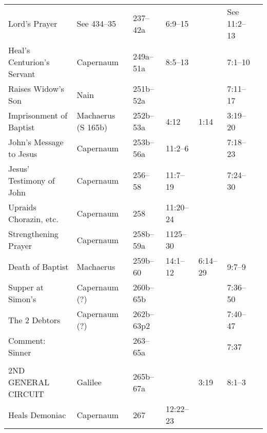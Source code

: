 \begin{longtable}[h]{l@{\hspace{0.5em}}l@{\hspace{0.5em}}l@{\hspace{0.5em}}BBBB}
\quad Lord's Prayer                        & See 434--35         & 237--42a           & 6:9--15           &                    & See 11:2--13          & \\
Heal's Centurion's Servant                 & Capernaum           & 249a--51a          & 8:5--13           &                    & 7:1--10               & \\
Raises Widow's Son                         & Nain                & 251b--52a          &                   &                    & 7:11--17              & \\
Imprisonment of Baptist                    & Machaerus (S 165b)  & 252b--53a          & 4:12              & 1:14               & 3:19--20              & \\
John's Message to Jesus                    & Capernaum           & 253b--56a          & 11:2--6           &                    & 7:18--23              & \\
Jesus' Testimony of John                   & Capernaum           & 256--58            & 11:7--19          &                    & 7:24--30              & \\
Upraids Chorazin, etc.                     & Capernaum           & 258                & 11:20--24         &                    &                       & \\
Strengthening Prayer                       & Capernaum           & 258b--59a          & 1125--30          &                    &                       & \\
Death of Baptist                           & Machaerus           & 259b--60           & 14:1--12          & 6:14--29           & 9:7--9                & \\
Supper at Simon's                          & Capernaum (?)       & 260b--65b          &                   &                    & 7:36--50              & \\
\quad The 2 Debtors                        & Capernaum (?)       & 262b--63p2         &                   &                    & 7:40--47              & \\
\quad Comment: Sinner                      &                     & 263--65a           &                   &                    & 7:37                  & \\
\\
2ND GENERAL CIRCUIT                        & Galilee             & 265b--67a          &                   & 3:19               & 8:1--3                & \\
Heals Demoniac                             & Capernaum           & 267                & 12:22--23         &                    &                       & \\

\end{longtable}
